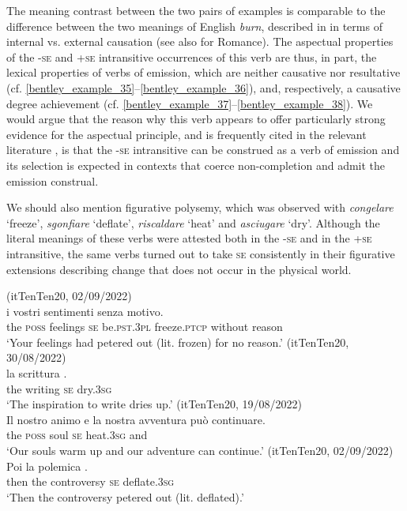 \documentclass[output=paper,colorlinks,citecolor=brown
]{langscibook}
\begin{document}
The meaning contrast between the two pairs of examples is comparable to the difference between the two meanings of English \textit{burn}, described in \citet[101]{levin1995unaccusativity} in terms of internal vs. external causation (see also \cite{bentley2023internally} for Romance). The aspectual properties of the -\textsc{se} and +\textsc{se} intransitive occurrences of this verb are thus, in part, the lexical properties of verbs of emission, which are neither causative nor resultative (cf. \ref{bentley_example_35}--\ref{bentley_example_36}), and, respectively, a causative degree achievement (cf. \ref{bentley_example_37}--\ref{bentley_example_38}). We would argue that the reason why this verb appears to offer particularly strong evidence for the aspectual principle, and is frequently cited in the relevant literature \citep{jezek2003classi,folli2005consuming,cennamo2011anticausative,cennamo2012aspectual}, is that the -\textsc{se} intransitive can be construed as a verb of emission and its selection is expected in contexts that coerce non-completion and admit the emission construal.

We should also mention figurative polysemy, which was observed with \textit{congelare} ‘freeze’, \textit{sgonfiare} ‘deflate’, \textit{riscaldare} ‘heat’ and \textit{asciugare} ‘dry’. Although the literal meanings of these verbs were attested both in the -\textsc{se} and in the +\textsc{se} intransitive, the same verbs turned out to take \textsc{se} consistently in their figurative extensions describing change that does not occur in the physical world.

\ea \label{bentley_example_39}(itTenTen20, 02/09/2022)\\
    \gll  {\ldots}  i			vostri		sentimenti				 								senza			motivo.  \\
    	{} 	the	\textsc{poss}			feelings			\textsc{se}		be.\textsc{pst}.3\textsc{pl}		freeze.\textsc{ptcp}		without	reason \\
    \glt 	‘Your feelings had petered out (lit. frozen) for no reason.’	
\ex \label{bentley_example_40}(itTenTen20, 30/08/2022)\\
    \gll  {\ldots}  la		scrittura				.  \\
    	{} the	writing		\textsc{se}		dry.3\textsc{sg} \\
    \glt ‘The inspiration to write dries up.’
\ex \label{bentley_example_41}(itTenTen20, 19/08/2022)\\
    \gll Il		nostro	animo			 e  {la nostra avventura può continuare. } \\
    	the	\textsc{poss}			soul		\textsc{se}		heat.3\textsc{sg}	and			{} \\
    \glt 					‘Our souls warm up and our adventure can continue.’
\ex \label{bentley_example_42}(itTenTen20, 02/09/2022)\\
    \gll Poi 	la		polemica						. \\
    			then	the	controversy	\textsc{se}		deflate.3\textsc{sg}	 \\
    \glt ‘Then the controversy petered out (lit. deflated).’
\z
\end{document}
